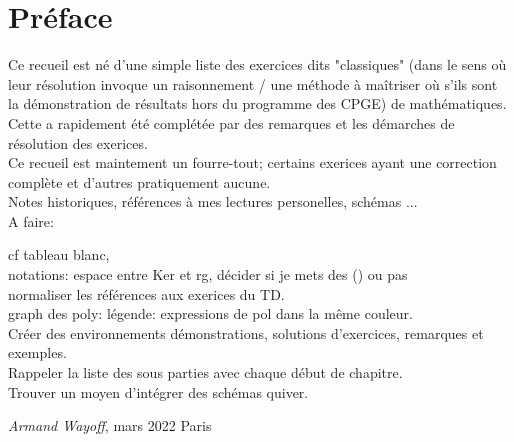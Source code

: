 \chapter*{Préface}

Ce recueil est né d'une simple liste des exercices dits "classiques" (dans le sens où leur résolution invoque un raisonnement / une méthode à maîtriser où s'ils sont la démonstration de résultats hors du programme des CPGE) de mathématiques. \\
Cette a rapidement été complétée par des remarques et les démarches de résolution des exerices. \\
Ce recueil est maintement un fourre-tout; certains exerices ayant une correction complète et d'autres pratiquement aucune. \\
Notes historiques, références à mes lectures personelles, schémas ... \\

A faire:

cf tableau blanc, \\
notations: espace entre Ker et rg, décider si je mets des () ou pas \\
normaliser les références aux exerices du TD. \\
graph des poly: légende: expressions de pol dans la même couleur.\\
Créer des environnements démonstrations, solutions d'exercices, remarques et exemples. \\
Rappeler la liste des sous parties avec chaque début de chapitre. \\
Trouver un moyen d'intégrer des schémas quiver.


\begin{flushright}
	\textit{Armand Wayoff}, mars 2022 Paris
\end{flushright}
